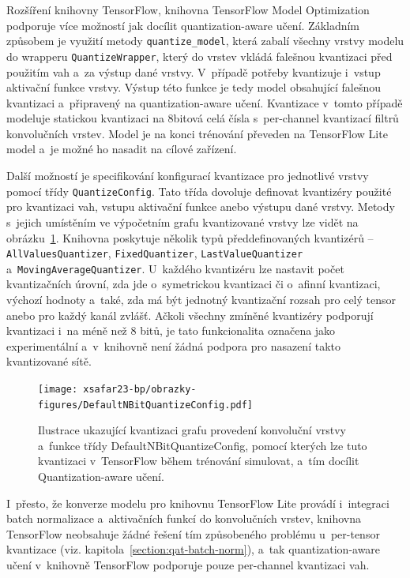 Rozšíření knihovny TensorFlow, knihovna TensorFlow Model Optimization \cite{tf-model-optimization} podporuje více možností jak docílit quantization-aware učení. Základním způsobem je využití metody \verb|quantize_model|, která zabalí všechny vrstvy modelu do wrapperu \verb|QuantizeWrapper|, který do vrstev vkládá falešnou kvantizaci před použitím vah a~za výstup dané vrstvy. V~případě potřeby kvantizuje i~vstup aktivační funkce vrstvy. Výstup této funkce je tedy model obsahující falešnou kvantizaci a~připravený na quantization-aware učení. Kvantizace v~tomto případě modeluje statickou kvantizaci na 8bitová celá čísla s~per-channel kvantizací filtrů konvolučních vrstev. Model je na konci trénování převeden na TensorFlow Lite model a~je možné ho nasadit na cílové zařízení.

Další možností je specifikování konfigurací kvantizace pro jednotlivé vrstvy pomocí třídy \verb|QuantizeConfig|. Tato třída dovoluje definovat kvantizéry použité pro kvantizaci vah, vstupu aktivační funkce anebo výstupu dané vrstvy. Metody s~jejich umístěním ve výpočetním grafu kvantizované vrstvy lze vidět na obrázku~\ref{fig:tf-qat-config}. Knihovna poskytuje několik typů předdefinovaných kvantizérů -- \verb|AllValuesQuantizer|, \verb|FixedQuantizer|, \texttt{LastValue\-Quantizer} a~\verb|MovingAverageQuantizer|. U~každého kvantizéru lze nastavit počet kvantizačních úrovní, zda jde o~symetrickou kvantizaci či o~afinní kvantizaci, výchozí hodnoty a~také, zda má být jednotný kvantizační rozsah pro celý tensor anebo pro každý kanál zvlášť. Ačkoli všechny zmíněné kvantizéry podporují kvantizaci i~na méně než 8 bitů, je tato funkcionalita označena jako experimentální a~v~knihovně není žádná podpora pro nasazení takto kvantizované sítě.

\begin{figure}[H]
	\centering
	\texttt{[image: xsafar23-bp/obrazky-figures/DefaultNBitQuantizeConfig.pdf]}
	\caption{Ilustrace ukazující kvantizaci  grafu provedení konvoluční vrstvy a~funkce třídy DefaultNBitQuantizeConfig, pomocí kterých lze tuto kvantizaci v~TensorFlow během trénování simulovat, a~tím docílit Quantization-aware učení.}
	\label{fig:tf-qat-config}
\end{figure}

I~přesto, že konverze modelu pro knihovnu TensorFlow Lite provádí i~integraci batch normalizace a~aktivačních funkcí do konvolučních vrstev, knihovna TensorFlow neobsahuje žádné řešení tím způsobeného problému u~per-tensor kvantizace (viz. kapitola~\ref{section:qat-batch-norm}), a~tak quantization-aware učení v~knihovně TensorFlow podporuje pouze per-channel kvantizaci vah.

